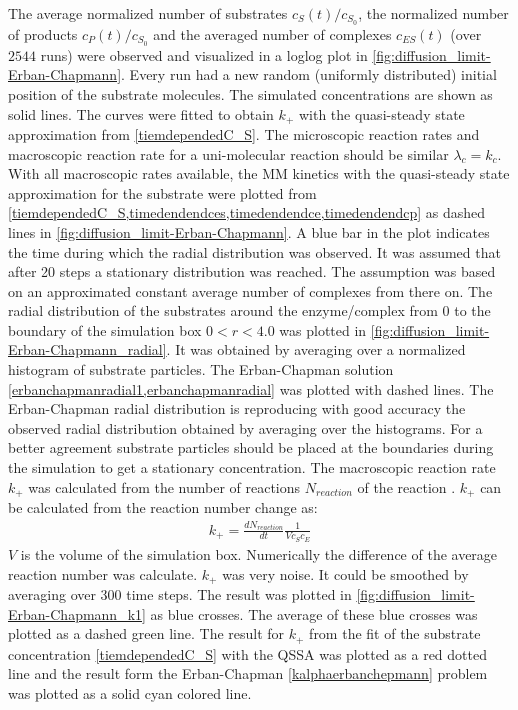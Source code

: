 \documentclass[
  a4paper,BCOR10mm,oneside,
  headsepline,footsepline,%
  fleqn,openbib
]{scrbook}
\begin{document}
The average normalized number of substrates $c_{S}(t)/c_{S_0}$, the normalized number of products $c_{P}(t)/c_{S_0}$ and the averaged number of complexes $c_{ES}(t)$  (over $2544$ runs) were observed and visualized in a loglog plot in \cref{fig:diffusion_limit-Erban-Chapmann}. Every run had a new random (uniformly distributed) initial position of the substrate molecules. The simulated concentrations are shown as solid lines. The curves were fitted to obtain $k_+$ with the quasi-steady state approximation from \cref{tiemdependedC_S}. The microscopic reaction rates and macroscopic reaction rate for a uni-molecular reaction should be similar $\lambda_c=k_c$.  With all macroscopic rates available, the MM kinetics with the quasi-steady state approximation for the substrate were plotted from \cref{tiemdependedC_S,timedendendces,timedendendce,timedendendcp} as dashed lines in \cref{fig:diffusion_limit-Erban-Chapmann}. A blue bar in the plot indicates the time during which the radial distribution was observed. It was assumed that after 20 steps a stationary distribution was reached. The assumption was based on an approximated constant average number of complexes from there on. The radial distribution of the substrates around the enzyme/complex from 0 to the boundary of the simulation box $0<r<4.0$ was plotted in \cref{fig:diffusion_limit-Erban-Chapmann_radial}. It was obtained by averaging over a normalized histogram of substrate particles. The Erban-Chapman solution \cref{erbanchapmanradial1,erbanchapmanradial} was plotted with dashed lines. The Erban-Chapman radial distribution is reproducing with good accuracy the observed radial distribution obtained by averaging over the histograms. For a better agreement substrate particles should be placed at the boundaries during the simulation to get a stationary concentration. The macroscopic reaction rate  $k_+$ was calculated from the number of reactions $N_{reaction}$ of the reaction . $k_+$ can be calculated from the reaction number change as:
 \begin{align} \label{reactioncount}
  k_+=\frac{d N_{reaction}}{dt}\frac{1}{V c_S c_E} 
 \end{align}
$V$ is the volume of the simulation box. Numerically the difference of the average reaction number was calculate. $k_+$ was very noise. It could be smoothed by averaging over 300 time steps. The result was plotted in \cref{fig:diffusion_limit-Erban-Chapmann_k1} as blue crosses. The average of these blue crosses was plotted as a dashed green line. The result for $k_+$ from the fit of the substrate concentration \cref{tiemdependedC_S} with the QSSA was plotted as a red dotted line and the result form the Erban-Chapman \cref{kalphaerbanchepmann} problem was plotted as a solid cyan colored line.\par
\end{document}
